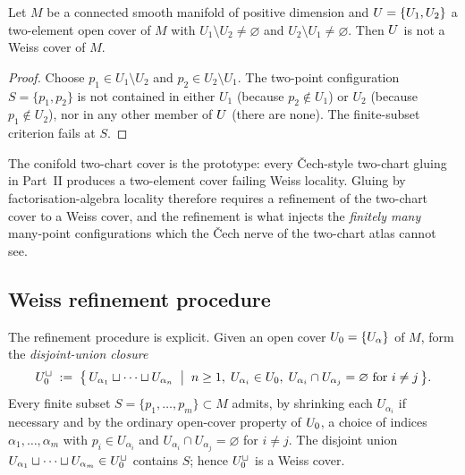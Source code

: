 \begin{proposition}
\label{prop:two-chart-not-weiss}
Let $M$ be a connected smooth manifold of positive dimension and
$U = \{U_1, U_2\}$ a two-element open cover of $M$ with
$U_1 \setminus U_2 \neq \varnothing$ and $U_2 \setminus U_1 \neq
\varnothing$. Then $U$ is not a Weiss cover of $M$.
\end{proposition}

\begin{proof}
Choose $p_1 \in U_1 \setminus U_2$ and $p_2 \in U_2 \setminus U_1$.
The two-point configuration $S = \{p_1, p_2\}$ is not contained in
either $U_1$ (because $p_2 \notin U_1$) or $U_2$ (because $p_1 \notin
U_2$), nor in any other member of $U$ (there are none). The
finite-subset criterion fails at $S$.
\end{proof}

The conifold two-chart cover is the prototype: every Čech-style
two-chart gluing in Part~II produces a two-element cover failing Weiss
locality. Gluing by factorisation-algebra locality therefore requires
a refinement of the two-chart cover to a Weiss cover, and the
refinement is what injects the \emph{finitely many} many-point
configurations which the Čech nerve of the two-chart atlas cannot see.

\subsection{Weiss refinement procedure}
\label{subsec:weiss-refinement}

The refinement procedure is explicit. Given an open cover $U_0 =
\{U_\alpha\}$ of $M$, form the \emph{disjoint-union closure}
\begin{equation}
\label{eq:weiss-refinement}
  U_0^{\sqcup} \;:=\; \bigl\{\, U_{\alpha_1} \sqcup \cdots \sqcup U_{\alpha_n}
    \;\bigm|\; n \ge 1, \; U_{\alpha_i} \in U_0, \;
    U_{\alpha_i} \cap U_{\alpha_j} = \varnothing \text{ for } i \ne j \,\bigr\}.
\end{equation}
Every finite subset $S = \{p_1, \dots, p_m\} \subset M$ admits, by
shrinking each $U_{\alpha_i}$ if necessary and by the ordinary
open-cover property of $U_0$, a choice of indices $\alpha_1, \dots,
\alpha_m$ with $p_i \in U_{\alpha_i}$ and $U_{\alpha_i} \cap
U_{\alpha_j} = \varnothing$ for $i \ne j$. The disjoint union
$U_{\alpha_1} \sqcup \cdots \sqcup U_{\alpha_m} \in U_0^{\sqcup}$
contains $S$; hence $U_0^{\sqcup}$ is a Weiss cover.

